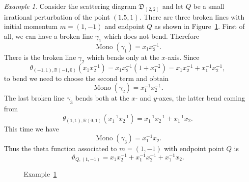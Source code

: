 \documentclass[10pt]{amsart}
\theoremstyle{remark}
\newtheorem{example}[theorem]{Example}
\numberwithin{equation}{section}
\newcommand{\RR}{\mathbb{R}}
\newcommand{\fD}{\mathfrak{D}}
\newcommand{\Mono}{\operatorname{Mono}}
\begin{document}
\begin{example} 
  \label{brokenex}
  Consider the scattering diagram $\fD_{(2,2)}$ and let $Q$ be a small
  irrational perturbation of the point $(1.5,1)$. There are three broken lines
  with initial momentum $m = (1,-1)$ and endpoint $Q$ as shown in
  Figure~\ref{figbrokenex}.
  First of all, we can have a broken line $\gamma_1$ which does not bend.
  Therefore
  \[
    \Mono(\gamma_1) = x_1 x_2^{-1}.
  \]
  There is the broken line $\gamma_2$  which bends only at the $x$-axis. Since
  \[ 
    \theta_{(-1,1), \RR(-1,0)} (x_1 x_2^{-1}) = 
    x_1 x_2^{-1}(1+x_1^{-2}) =  x_1 x_2^{-1} + x_1^{-1} x_2^{-1},
  \]
  to bend we need to choose the second term and obtain 
  \[
    \Mono(\gamma_2) =  x_1^{-1} x_2^{-1}.
  \]
  The last broken line $\gamma_3$ bends both at the $x$- and $y$-axes, the
  latter bend coming from
  \[ 
    \theta_{ (1,1), \RR (0,1)} ( x_1^{-1} x_2^{-1}) =  
    x_1^{-1} x_2^{-1} + x_1^{-1} x_2.  
  \]
  This time we have 
  \[
    \Mono (\gamma_3) = x_1^{-1} x_2.
  \]
  Thus the theta function associated to $m = (1,-1)$ with endpoint point $Q$ is 
  \[ 
    \vartheta_{Q, (1,-1)} =  
    x_1 x_2^{-1} + x_1^{-1} x_2^{-1} +x_1^{-1} x_2 .  
  \]
\end{example}

\begin{figure}
  \centering
  \caption{Example~\ref{brokenex}} 
  \label{figbrokenex}
\end{figure}
\end{document}
